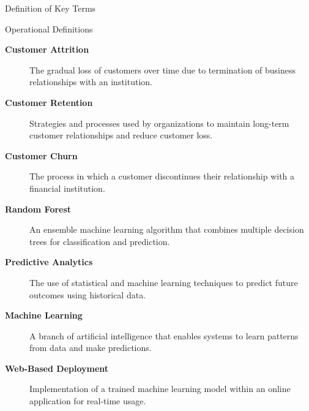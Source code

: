 \documentclass[10pt]{beamer}
\begin{document}
\begin{frame}{Definition of Key Terms}
	
	\small
	
	\begin{block}{Operational Definitions}
	\end{block}
	
	\vspace{0.2cm}
	
	\begin{description}
		
		\item[\textbf{Customer Attrition}]
		The gradual loss of customers over time due to termination of business relationships with an institution.
		
		\vspace{0.1cm}
		
		\item[\textbf{Customer Retention}]
		Strategies and processes used by organizations to maintain long-term customer relationships and reduce customer loss.
		
		\vspace{0.1cm}
		
		\item[\textbf{Customer Churn}]
		The process in which a customer discontinues their relationship with a financial institution.
		
		\vspace{0.1cm}
		
		\item[\textbf{Random Forest}]
		An ensemble machine learning algorithm that combines multiple decision trees for classification and prediction.
		
		\vspace{0.1cm}
		
		\item[\textbf{Predictive Analytics}]
		The use of statistical and machine learning techniques to predict future outcomes using historical data.
		
		\vspace{0.1cm}
		
		\item[\textbf{Machine Learning}]
		A branch of artificial intelligence that enables systems to learn patterns from data and make predictions.
		
		\vspace{0.1cm}
		
		\item[\textbf{Web-Based Deployment}]
		Implementation of a trained machine learning model within an online application for real-time usage.
		
	\end{description}
	
\end{frame}
\end{document}
